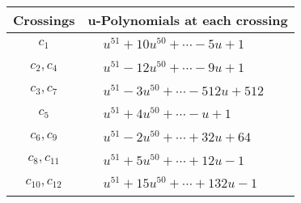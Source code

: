 \documentclass[1p]{elsarticle_modified}
\theoremstyle{definition}
\begin{document}
\begin{tabular}{m{50pt}|m{274pt}}
Crossings & \hspace{64pt}u-Polynomials at each crossing \\
\hline $$\begin{aligned}c_{1}\end{aligned}$$&$\begin{aligned}
&u^{51}+10 u^{50}+\cdots-5 u+1
\end{aligned}$\\
\hline $$\begin{aligned}c_{2},c_{4}\end{aligned}$$&$\begin{aligned}
&u^{51}-12 u^{50}+\cdots-9 u+1
\end{aligned}$\\
\hline $$\begin{aligned}c_{3},c_{7}\end{aligned}$$&$\begin{aligned}
&u^{51}-3 u^{50}+\cdots-512 u+512
\end{aligned}$\\
\hline $$\begin{aligned}c_{5}\end{aligned}$$&$\begin{aligned}
&u^{51}+4 u^{50}+\cdots- u+1
\end{aligned}$\\
\hline $$\begin{aligned}c_{6},c_{9}\end{aligned}$$&$\begin{aligned}
&u^{51}-2 u^{50}+\cdots+32 u+64
\end{aligned}$\\
\hline $$\begin{aligned}c_{8},c_{11}\end{aligned}$$&$\begin{aligned}
&u^{51}+5 u^{50}+\cdots+12 u-1
\end{aligned}$\\
\hline $$\begin{aligned}c_{10},c_{12}\end{aligned}$$&$\begin{aligned}
&u^{51}+15 u^{50}+\cdots+132 u-1
\end{aligned}$\\
\hline
\end{tabular}\\~\\
\newpage\renewcommand{\arraystretch}{1}
\end{document}

